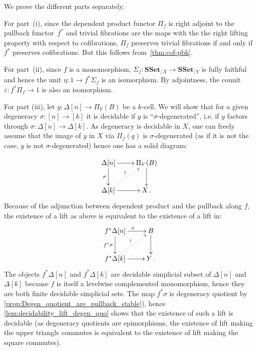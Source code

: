 \documentclass[reqno,10pt,a4paper,oneside]{amsart}
\makeatletter
\renewenvironment{proof}[1][\proofname] {\par\pushQED{\qed}\normalfont\topsep6\p@\@plus6\p@\relax\trivlist\item[\hskip\labelsep\bf#1\@addpunct{.}]\ignorespaces}{\popQED\endtrivlist\@endpefalse}
\numberwithin{equation}{section}
\theoremstyle{mythm}
\theoremstyle{mydef}
\theoremstyle{myrmk}
\newcommand{\co}{\colon}
\newcommand{\SSet}{\mathbf{SSet}}
\makeatother
\begin{document}
 
\begin{proof} We prove the different parts separately. 

For part~(i), since the dependent product functor $\Pi_f$ is right adjoint to the pullback functor~$f^*$ and trivial fibrations are the maps with the the right lifting property with respect to cofibrations, $\Pi_f$ preserves trivial fibrations if and only if $f^*$ preserves cofibrations. But this follows from~\cref{thm:cof-pbk}.

For part~(ii),  since $f$ is a monomorphism,  $\Sigma_f \co \SSet_{/X} \rightarrow \SSet_{/Y}$ is fully faithful and hence the unit $\eta \co 1 \rightarrow f^*  \Sigma_{f}$ is an isomorphism. By adjointness, the counit $\varepsilon \co f^* \Pi_f \rightarrow 1$ is also an isomorphism. 

For part (iii), let $y \co  \Delta[n] \rightarrow \Pi_Y(B)$ be a  $k$-cell. We will show that for a given degeneracy $\sigma \co [n] \rightarrow [k]$ it is decidable if $y$ is ``$\sigma$-degenerated'', i.e. if $y$ factors through $\sigma \co \Delta[n] \rightarrow \Delta[k]$. As degeneracy is decidable in $X$, one can freely assume that the image of   $y$ in $X$ via $\Pi_f(q)$ is $\sigma$-degenerated (as if it is not the case, $y$ is not $\sigma$-degenerated) hence one has a solid diagram:

\[
\xymatrix{
\Delta[n] \ar[d]_{\sigma} \ar[r] & \Pi_Y(B) \ar[d] \\
\Delta[k] \ar@{.>}[ur]^? \ar[r] & X \, . \\
}
\]
Because of the adjunction between dependent product and the pullback along $f$, the existence of a lift as above is equivalent to the existence of a lift in:
\[
\xymatrix{
f^* \Delta[n] \ar[d]_{f^* \sigma} \ar[r]^x & B \ar[d] \\
f^* \Delta[k] \ar@{.>}[ur]^? \ar[r] & Y \, .  \\
}
\]
The objects $f^* \Delta[n]$ and $f^* \Delta[k]$ are decidable simplicial subset of $\Delta[n]$ and $\Delta[k]$ because $f$ is itself a levelwise complemented monomorphism, hence they are both finite decidable simplicial sets. The map $f^* \sigma$ is degeneracy quotient by \cref{prop:Degen_quotient_are_pullback_stable}), hence \cref{lem:decidability_lift_degen_quo} shows that the existence of such a lift is decidable (as degeneracy quotients are epimorphisms, the existence of lift making the upper triangle commutes is equivalent to the existence of lift making the square commutes).




\end{proof}
\end{document}
